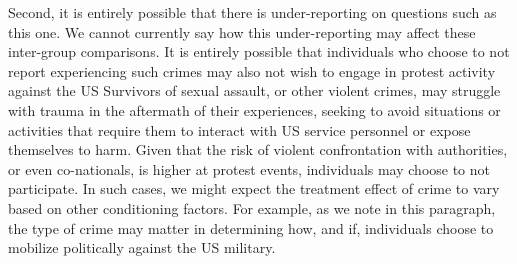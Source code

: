 Second, it is entirely possible that there is under-reporting on questions such as this one. We cannot currently say how this under-reporting may affect these inter-group comparisons. It is entirely possible that individuals who choose to not report experiencing such crimes may also not wish to engage in protest activity against the US Survivors of sexual assault, or other violent crimes, may struggle with trauma in the aftermath of their experiences, seeking to avoid situations or activities that require them to interact with US service personnel or expose themselves to harm. Given that the risk of violent confrontation with authorities, or even co-nationals, is higher at protest events, individuals may choose to not participate. In such cases, we might expect the treatment effect of crime to vary based on other conditioning factors. For example, as we note in this paragraph, the type of crime may matter in determining how, and if, individuals choose to mobilize politically against the US military.









